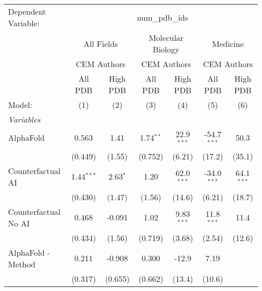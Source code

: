 \begingroup
\centering
\begin{tabular}{lcccccc}
   \tabularnewline \midrule \midrule
   Dependent Variable: & \multicolumn{6}{c}{num\_pdb\_ids}\\
 & \multicolumn{2}{c}{All Fields} & \multicolumn{2}{c}{Molecular Biology} & \multicolumn{2}{c}{Medicine} \\
\cmidrule(lr){2-3} \cmidrule(lr){4-5} \cmidrule(lr){6-7}
 & \multicolumn{2}{c}{CEM Authors} & \multicolumn{2}{c}{CEM Authors} & \multicolumn{2}{c}{CEM Authors} \\
\cmidrule(lr){2-3} \cmidrule(lr){4-5} \cmidrule(lr){6-7}
 & \multicolumn{1}{c}{All PDB} & \multicolumn{1}{c}{High PDB} & \multicolumn{1}{c}{All PDB} & \multicolumn{1}{c}{High PDB} & \multicolumn{1}{c}{All PDB} & \multicolumn{1}{c}{High PDB} \\
\cmidrule(lr){2-2} \cmidrule(lr){3-3} \cmidrule(lr){4-4} \cmidrule(lr){5-5} \cmidrule(lr){6-6} \cmidrule(lr){7-7}
   Model:                                                     & (1)           & (2)        & (3)         & (4)          & (5)           & (6)\\  
   \midrule
   \emph{Variables}\\
   AlphaFold                                                  & 0.563         & 1.41       & 1.74$^{**}$ & 22.9$^{***}$ & -54.7$^{***}$ & 50.3\\   
                                                              & (0.449)       & (1.55)     & (0.752)     & (6.21)       & (17.2)        & (35.1)\\   
   Counterfactual AI                                          & 1.44$^{***}$  & 2.63$^{*}$ & 1.20        & 62.0$^{***}$ & -34.0$^{***}$ & 64.1$^{***}$\\   
                                                              & (0.430)       & (1.47)     & (1.56)      & (14.6)       & (6.21)        & (18.7)\\   
   Counterfactual No AI                                       & 0.468         & -0.091     & 1.02        & 9.83$^{***}$ & 11.8$^{***}$  & 11.4\\   
                                                              & (0.434)       & (1.56)     & (0.719)     & (3.68)       & (2.54)        & (12.6)\\   
   AlphaFold - Method                                         & 0.211         & -0.908     & 0.300       & -12.9        & 7.19          &   \\   
                                                              & (0.317)       & (0.655)    & (0.662)     & (13.4)       & (10.6)        &   \\   

\end{tabular}

